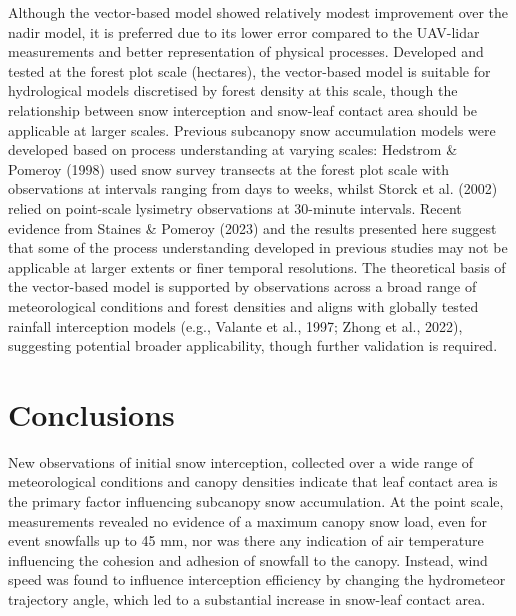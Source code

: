 \documentclass[
  letterpaper,
]{tex/uofsthesis-cs}
\begin{document}
Although the vector-based model showed relatively modest improvement
over the nadir model, it is preferred due to its lower error compared to
the UAV-lidar measurements and better representation of physical
processes. Developed and tested at the forest plot scale (hectares), the
vector-based model is suitable for hydrological models discretised by
forest density at this scale, though the relationship between snow
interception and snow-leaf contact area should be applicable at larger
scales. Previous subcanopy snow accumulation models were developed based
on process understanding at varying scales: Hedstrom \& Pomeroy (1998)
used snow survey transects at the forest plot scale with observations at
intervals ranging from days to weeks, whilst Storck et al. (2002) relied
on point-scale lysimetry observations at 30-minute intervals. Recent
evidence from Staines \& Pomeroy (2023) and the results presented here
suggest that some of the process understanding developed in previous
studies may not be applicable at larger extents or finer temporal
resolutions. The theoretical basis of the vector-based model is
supported by observations across a broad range of meteorological
conditions and forest densities and aligns with globally tested rainfall
interception models (e.g., Valante et al., 1997; Zhong et al., 2022),
suggesting potential broader applicability, though further validation is
required.

\section{Conclusions}\label{conclusions-1}

New observations of initial snow interception, collected over a wide
range of meteorological conditions and canopy densities indicate that
leaf contact area is the primary factor influencing subcanopy snow
accumulation. At the point scale, measurements revealed no evidence of a
maximum canopy snow load, even for event snowfalls up to 45 mm, nor was
there any indication of air temperature influencing the cohesion and
adhesion of snowfall to the canopy. Instead, wind speed was found to
influence interception efficiency by changing the hydrometeor trajectory
angle, which led to a substantial increase in snow-leaf contact area.
\end{document}
